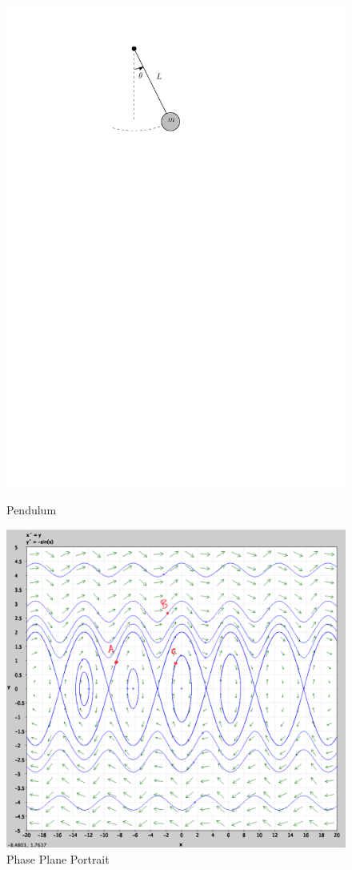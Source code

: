 \documentclass[11pt]{article}
\begin{document}
\begin{enumerate}[resume]
	\begin{figure}[h]
    	\centering
	    	\parbox{5cm}{
	    	\includegraphics[scale=.7]{Pendulum.pdf}
	    	\caption{Pendulum}
    	\label{fig:pendulum}}
    	\qquad
		    \begin{minipage}{5cm}
		    \includegraphics[width=6 cm]{pendulum.png}
		    \caption{Phase Plane Portrait}
		    \label{}
	    \end{minipage}
    \end{figure}
		
\end{enumerate}
\end{document}
